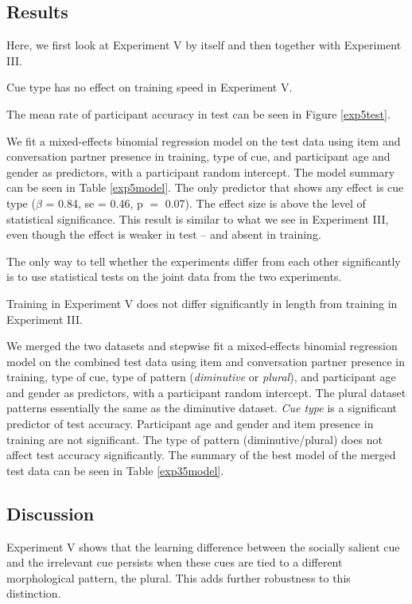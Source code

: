\documentclass{frontiersSCNS} %
\begin{document}
\subsection{Results}




Here, we first look at Experiment V by itself and then together with Experiment III.

Cue type has no effect on training speed in Experiment V. 

The mean rate of participant accuracy in test can be seen in Figure \ref{exp5test}.

We fit a mixed-effects binomial regression model on the test data using item and conversation partner presence in training, type of cue, and participant age and gender as predictors, with a participant random intercept. The model summary can be seen in Table \ref{exp5model}. The only predictor that shows any effect is cue type ($\beta{}$ = 0.84, se = 0.46, p $=$ 0.07). The effect size is above the level of statistical significance. This result is similar to what we see in Experiment III, even though the effect is weaker in test -- and absent in training.

The only way to tell whether the experiments differ from each other significantly is to use statistical tests on the joint data from the two experiments.

Training in Experiment V does not differ significantly in length from training in Experiment III. 

We merged the two datasets and stepwise fit a mixed-effects binomial regression model on the combined test data using item and conversation partner presence in training, type of cue, type of pattern (\emph{diminutive} or \emph{plural}), and participant age and gender as predictors, with a participant random intercept. The plural dataset patterns essentially the same as the diminutive dataset. \emph{Cue type} is a significant predictor of test accuracy. Participant age and gender and item presence in training are not significant. The type of pattern (diminutive/plural) does not affect test accuracy significantly. The summary of the best model of the merged test data can be seen in Table \ref{exp35model}.


\subsection{Discussion}

Experiment V shows that the learning difference between the socially salient cue and the irrelevant cue persists when these cues are tied to a different morphological pattern, the plural. This adds further robustness to this distinction.
\end{document}
